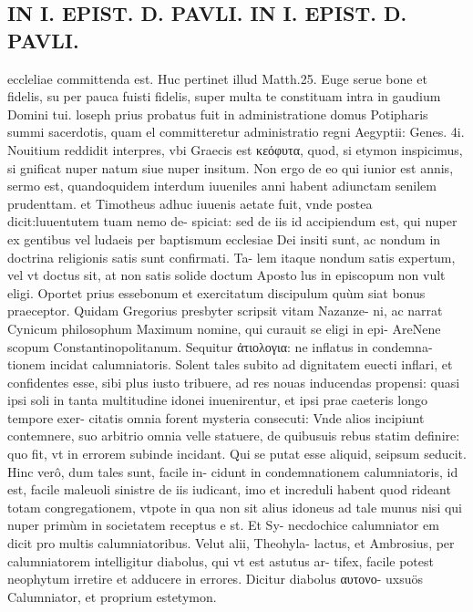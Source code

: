 \documentclass{article}
\begin{document}
\begin{pages}
\section*{IN I. EPIST. D. PAVLI. IN I. EPIST. D. PAVLI. }
\marginpar{[ p.80 ]}\pstart eccleliae committenda est. Huc pertinet illud Matth.25. Euge serue bone et fidelis, su per pauca fuisti fidelis, super multa te constituam intra in gaudium Domini tui. loseph prius probatus fuit in administratione domus Potipharis summi sacerdotis, quam el committeretur administratio regni Aegyptii: Genes. 4i.  \pend\pstart Nouitium reddidit interpres, vbi Graecis est κεόφυτα, quod, si etymon inspicimus, si gnificat nuper natum siue nuper insitum. Non ergo de eo qui iunior est annis, sermo est, quandoquidem interdum iuueniles anni habent adiunctam senilem prudenttam. et Timotheus adhuc iuuenis aetate fuit, vnde postea dicit:luuentutem tuam nemo de- spiciat: sed de iis id accipiendum est, qui nuper ex gentibus vel ludaeis per baptismum ecclesiae Dei insiti sunt, ac nondum in doctrina religionis satis sunt confirmati. Ta- lem itaque nondum satis expertum, vel vt doctus sit, at non satis solide doctum Aposto lus in episcopum non vult eligi. Oportet prius essebonum et exercitatum discipulum quùm siat bonus praeceptor. Quidam Gregorius presbyter scripsit vitam Nazanze- ni, ac narrat Cynicum philosophum Maximum nomine, qui curauit se eligi in epi- AreNene scopum Constantinopolitanum. Sequitur ἀτιολογια: ne inflatus in condemna- tionem incidat calumniatoris. Solent tales subito ad dignitatem euecti inflari, et confidentes esse, sibi plus iusto tribuere, ad res nouas inducendas propensi: quasi ipsi soli in tanta multitudine idonei inuenirentur, et ipsi prae caeteris longo tempore exer- citatis omnia forent mysteria consecuti: Vnde alios incipiunt contemnere, suo arbitrio omnia velle statuere, de quibusuis rebus statim definire: quo fit, vt in errorem subinde incidant. Qui se putat esse aliquid, seipsum seducit. Hinc verô, dum tales sunt, facile in- cidunt in condemnationem calumniatoris, id est, facile maleuoli sinistre de iis iudicant, imo et increduli habent quod rideant totam congregationem, vtpote in qua non sit alius idoneus ad tale munus nisi qui nuper primùm in societatem receptus e st. Et Sy- necdochice calumniator em dicit pro multis calumniatoribus. Velut alii, Theohyla- lactus, et Ambrosius, per calumniatorem intelligitur diabolus, qui vt est astutus ar- tifex, facile potest neophytum irretire et adducere in errores. Dicitur diabolus αυτονο- uxsuös Calumniator, et proprium estetymon.  \pend
{}
{}

\end{pages}
\end{document}
